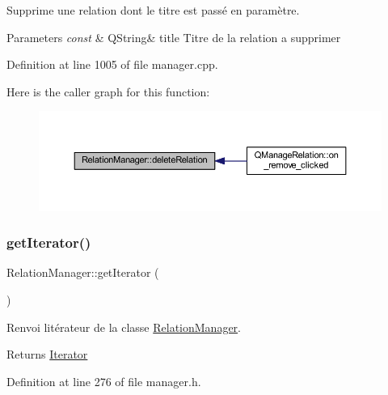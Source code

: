 Supprime une relation dont le titre est passé en paramètre. 


\begin{DoxyParams}{Parameters}
{\em const} & Q\+String\& title Titre de la relation a supprimer \\
\hline
\end{DoxyParams}


Definition at line 1005 of file manager.\+cpp.

Here is the caller graph for this function\+:\nopagebreak
\begin{figure}[H]
\begin{center}
\leavevmode
\includegraphics[width=350pt]{class_relation_manager_a074413b3ed72a1342821e911c1fa3587_icgraph}
\end{center}
\end{figure}
\mbox{\label{class_relation_manager_a467cb7895b238376feaac142cdec5dab}} 
\subsubsection{\texorpdfstring{get\+Iterator()}{getIterator()}}
{\footnotesize\ttfamily Relation\+Manager\+::get\+Iterator (\begin{DoxyParamCaption}{ }\end{DoxyParamCaption})\hspace{0.3cm}{\ttfamily [inline]}}



Renvoi l\textquotesingle{}itérateur de la classe \hyperlink{class_relation_manager}{Relation\+Manager}. 

\begin{DoxyReturn}{Returns}
\hyperlink{class_relation_manager_1_1_iterator}{Iterator} 
\end{DoxyReturn}


Definition at line 276 of file manager.\+h.

